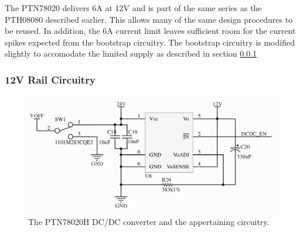 The PTN78020 delivers 6A at 12V and is part of the same series as the PTH08080 described earlier.
This allows many of the same design procedures to be reused.
In addition, the 6A current limit leaves sufficient room for the current spikes expected from the bootstrap circuitry.
The bootstrap circuitry is modified slightly to accomodate the limited supply as described in section \ref{}



\subsubsection{12V Rail Circuitry}

\begin{figure}
	\centering
	\includegraphics[width=\linewidth]{graphics/dcdc12v}
	\caption{The PTN78020H DC/DC converter and the appertaining circuitry.}
	\label{fig:dcdc12v}
\end{figure}

